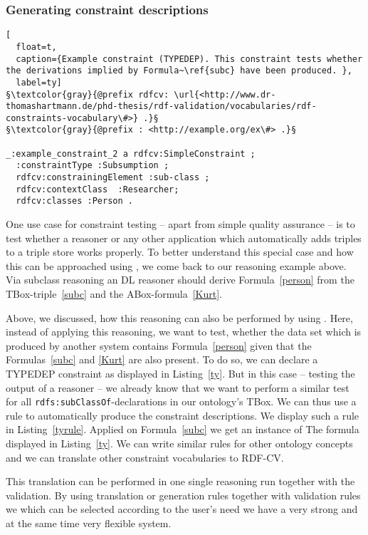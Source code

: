 \subsubsection{Generating constraint descriptions}
\begin{lstlisting}[
  float=t,
  caption={Example constraint (TYPEDEP). This constraint tests whether the derivations implied by Formula~\ref{subc} have been produced. },
  label=ty]
§\textcolor{gray}{@prefix rdfcv: \url{<http://www.dr-thomashartmann.de/phd-thesis/rdf-validation/vocabularies/rdf-constraints-vocabulary\#>} .}§
§\textcolor{gray}{@prefix : <http://example.org/ex\#> .}§

_:example_constraint_2 a rdfcv:SimpleConstraint ;
  :constraintType :Subsumption ;
  rdfcv:constrainingElement :sub-class ;
  rdfcv:contextClass  :Researcher;
  rdfcv:classes :Person .
\end{lstlisting}
One use case for constraint testing -- apart from simple quality assurance -- is to test whether a reasoner or any other application which automatically 
adds triples to a triple store works properly. 
To better understand this special case and how this can be approached using \nthree, we come back to our reasoning example above. Via subclass reasoning an 
\owl DL reasoner should derive Formula~\ref{person} from the  TBox-triple~\ref{subc} and the ABox-formula~\ref{Kurt}. %

Above, we discussed, how this reasoning can also be performed by using \nthree. Here, instead of applying this reasoning, we want to test, whether the data set 
which is produced by another system contains Formula~\ref{person} given that the Formulas~\ref{subc} and \ref{Kurt} are also present. 
To do so, we can declare a TYPEDEP constraint as displayed in Listing~\ref{ty}. But in this case -- testing the output of a reasoner -- we already know that we want to perform a similar test
for all \texttt{rdfs:subClassOf}-declarations in our ontology's TBox. 
We can thus use a rule to automatically produce the constraint descriptions. We display such a rule in Listing~\ref{tyrule}.
Applied on Formula~\ref{subc} we get an instance of The formula displayed in Listing~\ref{ty}. We can write similar rules for other ontology concepts and we can translate other constraint 
vocabularies to RDF-CV. 

This translation can be performed in one single reasoning run together with the validation. By using translation or generation rules together with validation rules we
which can be selected according to the user's need we have a very strong and at the same time very flexible system.

